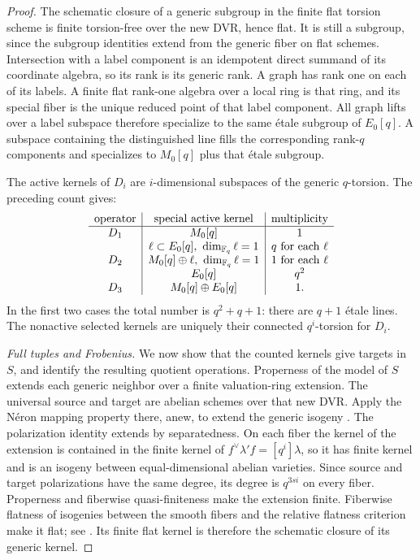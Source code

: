 \begin{proof}
The schematic closure of a generic subgroup in the finite flat
torsion scheme is finite torsion-free over the new DVR, hence
flat.  It is still a subgroup, since the subgroup identities
extend from the generic fiber on flat schemes.  Intersection
with a label component is an idempotent direct summand of its
coordinate algebra, so its rank is its generic rank.  A graph
has rank one on each of its labels.  A finite flat rank-one
algebra over a local ring is that ring, and its special fiber
is the unique reduced point of that label component.  All
graph lifts over a label subspace therefore specialize to the
same étale subgroup of \(E_0[q]\).  A subspace containing the
distinguished line fills the corresponding rank-\(q\) components
and specializes to \(M_0[q]\) plus that étale subgroup.

The active kernels of \(D_i\) are \(i\)-dimensional subspaces of
the generic \(q\)-torsion.  The preceding count gives:
\[
\begin{array}{c|c|c}
\text{operator}&\text{special active kernel}&\text{multiplicity}\\ \hline
D_1&M_0[q]&1\\
   &\ell\subset E_0[q],\ \dim_{\mathbb{F}_q}\ell=1&q\text{ for each }\ell\\
D_2&M_0[q]\oplus\ell,\ \dim_{\mathbb{F}_q}\ell=1&1\text{ for each }\ell\\
   &E_0[q]&q^2\\
D_3&M_0[q]\oplus E_0[q]&1 .
\end{array}
\]
In the first two cases the total number is \(q^2+q+1\):
there are \(q+1\) étale lines.  The nonactive selected kernels
are uniquely their connected \(q^i\)-torsion for \(D_i\).

\smallskip
\noindent\emph{Full tuples and Frobenius.}
We now show that the counted kernels give targets in \(S\), and
identify the resulting quotient operations.  Properness of the
model of \(S\) extends each generic neighbor
over a finite valuation-ring extension.  The universal source
and target are abelian schemes over that new DVR.  Apply the
Néron mapping property there, anew, to extend the generic
isogeny \cite[\S1.2, Proposition~8]{BoschLutkebohmertRaynaud1990}.
The polarization identity extends by separatedness.  On each
fiber the kernel of the extension is contained in the finite
kernel of \(f^\vee\lambda'f=[q^i]\lambda\), so it has finite
kernel and is an isogeny between equal-dimensional abelian
varieties.  Since source and target polarizations have the
same degree, its degree is \(q^{3si}\) on every fiber.
Properness and fiberwise quasi-finiteness make the extension
finite.  Fiberwise flatness of isogenies between the smooth fibers
and the relative flatness criterion make it flat;
see \cite[\S7.3, Lemma~1 and Proposition~6; \S2.4,
Proposition~2]{BoschLutkebohmertRaynaud1990}.
Its finite flat kernel is therefore the
schematic closure of its generic kernel.


\end{proof}
